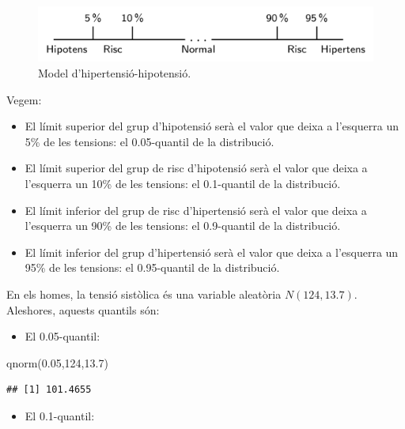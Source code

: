 \documentclass[
]{book}
\newenvironment{Shaded}{\begin{snugshade}}{\end{snugshade}}
\newcommand{\DecValTok}[1]{\textcolor[rgb]{0.00,0.00,0.81}{#1}}
\newcommand{\FloatTok}[1]{\textcolor[rgb]{0.00,0.00,0.81}{#1}}
\newcommand{\FunctionTok}[1]{\textcolor[rgb]{0.00,0.00,0.00}{#1}}
\newcommand{\NormalTok}[1]{#1}
\providecommand{\tightlist}{%
  \setlength{\itemsep}{0pt}\setlength{\parskip}{0pt}}
\theoremstyle{definition}
\theoremstyle{definition}
\theoremstyle{definition}
\theoremstyle{remark}
\begin{document}
\begin{figure}

{\centering \includegraphics[width=0.8\linewidth]{Bioestadistica-II_files/figure-html/hiperhipo} 

}

\caption{Model d'hipertensió-hipotensió.}\label{fig:hiperhipo}
\end{figure}

Vegem:

\begin{itemize}
\tightlist
\item
  El límit superior del grup d'hipotensió serà el valor que deixa a l'esquerra un 5\% de les tensions: el 0.05-quantil de la distribució.
\item
  El límit superior del grup de risc d'hipotensió serà el valor que deixa a l'esquerra un 10\% de les tensions: el 0.1-quantil de la distribució.
\item
  El límit inferior del grup de risc d'hipertensió serà el valor que deixa a l'esquerra un 90\% de les tensions: el 0.9-quantil de la distribució.
\item
  El límit inferior del grup d'hipertensió serà el valor que deixa a l'esquerra un 95\% de les tensions: el 0.95-quantil de la distribució.
\end{itemize}

En els homes, la tensió sistòlica és una variable aleatòria \(N(124,13.7)\). Aleshores, aquests quantils són:

\begin{itemize}
\tightlist
\item
  El 0.05-quantil:
\end{itemize}

\begin{Shaded}
\begin{Highlighting}[]
\FunctionTok{qnorm}\NormalTok{(}\FloatTok{0.05}\NormalTok{,}\DecValTok{124}\NormalTok{,}\FloatTok{13.7}\NormalTok{)}
\end{Highlighting}
\end{Shaded}

\begin{verbatim}
## [1] 101.4655
\end{verbatim}

\begin{itemize}
\tightlist
\item
  El 0.1-quantil:
\end{itemize}
\end{document}
